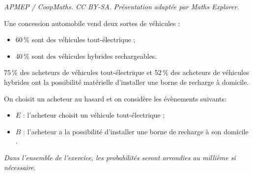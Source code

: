 \documentclass[10pt]{article}
\begin{document}
\noindent\textit{APMEP / CoopMaths. CC BY-SA. Présentation adaptée par Maths Explorer.}\par\medskip
\medskip

Une concession automobile vend deux sortes de véhicules :


\begin{itemize}[label=$\bullet~$]
\item 60\,\% sont des véhicules tout-électrique ;
\item 40\,\% sont des véhicules hybrides rechargeables.
\end{itemize}

\medskip

75\,\% des acheteurs de véhicules tout-électrique et 52\,\% des acheteurs de véhicules hybrides ont la possibilité matérielle d'installer une borne de recharge à domicile.

On choisit un acheteur au hasard et on considère les évènements suivants:

\begin{itemize}[label=$\bullet~$]
\item $E$ : \og l'acheteur choisit un véhicule tout-électrique \fg{} ;
\item $B$ : \og l'acheteur a la possibilité d'installer une borne de recharge à son domicile \fg.
\end{itemize}

\medskip

\emph{Dans l'ensemble de l'exercice, les probabilités seront arrondies au millième si nécessaire.}

\medskip
\end{document}
